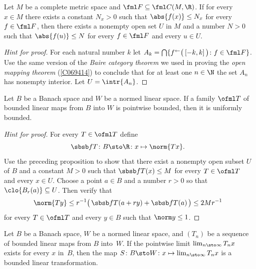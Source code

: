 \begin{prop}\label{C070117} Let $M$ be a complete metric space and $\fml F \subseteq \fml C(M,\R)$.
If for every $x \in M$ there exists a constant $N_x > 0$ such that $\abs{f(x)} \le N_x$ for
every $f \in \fml F$, then there exists a nonempty open set $U$ in $M$ and  a number $N > 0$ such
that $\abs{f(u)} \le N$ for every $f \in \fml F$ and every $u \in U$.
\end{prop}

\begin{proof}[\emph{Hint for proof}] For each natural number $k$ let $A_k =
\bigcap\{f^{\gets}\bigl(\,[-k,k]\,\bigr)\colon f \in \fml F\}$.  Use the same version of the
\emph{Baire category theorem} we used in proving the \emph{open mapping theorem} (\ref{C069414})
to conclude that for at least one $n \in \N$ the set $A_n$ has nonempty
interior. Let $U = \intr{A_n}$.   \ns
\end{proof}

\begin{thm}\label{thm_PUB} Let $B$ be a Banach space and $W$ be a normed linear space.
If a family $\ofml T$ of bounded linear maps from $B$ into $W$ is pointwise
bounded, then it is uniformly bounded.
\end{thm}

\begin{proof}[\emph{Hint for proof}] For every $T \in \ofml T$ define
  \[ \sbsb fT\colon B \sto \R\colon x \mapsto \norm{Tx}. \]
Use the preceding proposition to show that there exist a nonempty open subset $U$ of $B$
and a constant $M > 0$ such that $\sbsb fT(x) \le M$ for every $T \in \ofml T$ and every
$x \in U$. Choose a point $a \in B$ and a number $r > 0$ so that $\clo{B_r(a)} \subseteq
U$. Then verify that
  \[ \norm{Ty} \le r^{-1}\bigl(\, \sbsb fT(a + ry) + \sbsb fT(a)\,\bigr) \le 2Mr^{-1} \]
for every $T \in \ofml T$ and every $y \in B$ such that $\norm y \le 1$. \ns
\end{proof}

\begin{thm}  Let $B$ be a Banach space, $W$ be a normed linear space,
and $(T_n)$ be a sequence of bounded linear maps from $B$ into~$W$. If the pointwise limit
$\lim_{n \sto \infty} T_nx$ exists for every $x$ in~$B$, then the map $S\colon B \sto
W\colon x \mapsto \lim_{n \sto \infty} T_nx$ is a bounded linear transformation.
\end{thm}

